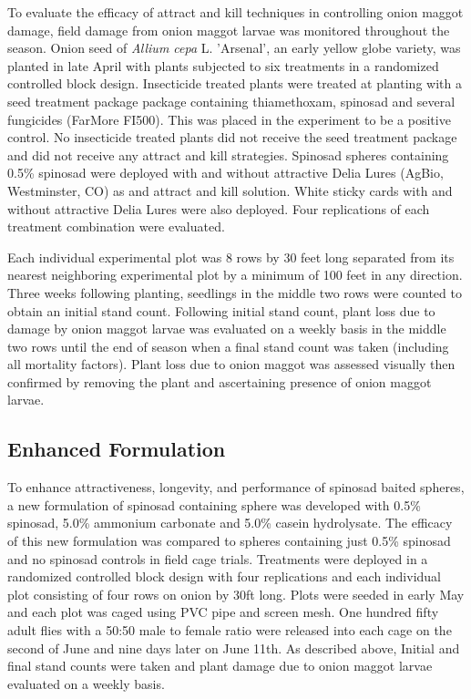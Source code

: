 \documentclass[alpha-refs]{wiley-article}
\begin{document}
To evaluate the efficacy of attract and kill techniques in controlling onion maggot damage, field damage from onion maggot larvae was monitored throughout the season.  Onion seed of \textit{Allium cepa} L. 'Arsenal', an early yellow globe variety, was planted in late April with plants subjected to six treatments in a randomized controlled block design.  Insecticide treated plants were treated at planting with a seed treatment package package containing thiamethoxam, spinosad and several fungicides (FarMore FI500).  This was placed in the experiment to be a positive control.  No insecticide treated plants did not receive the seed treatment package and did not receive any attract and kill strategies.  Spinosad spheres containing 0.5\% spinosad were deployed with and without attractive Delia Lures (AgBio, Westminster, CO) as and attract and kill solution.  White sticky cards with and without attractive Delia Lures were also deployed.   Four replications of each treatment combination were evaluated.  

Each individual experimental plot was 8 rows by 30 feet long separated from its nearest neighboring experimental plot by a minimum of 100 feet in any direction.  Three weeks following planting, seedlings in the middle two rows were counted to obtain an initial stand count.  Following initial stand count, plant loss due to damage by onion maggot larvae was evaluated on a weekly basis in the middle two rows until the end of season when a final stand count was taken (including all mortality factors).  Plant loss due to onion maggot was assessed visually then confirmed by removing the plant and ascertaining presence of onion maggot larvae.  

\subsection{Enhanced Formulation}

To enhance attractiveness, longevity, and performance of spinosad baited spheres, a new formulation of spinosad containing sphere was developed with 0.5\% spinosad, 5.0\% ammonium carbonate and 5.0\% casein hydrolysate.  The efficacy of this new formulation was compared to spheres containing just 0.5\% spinosad and no spinosad controls in field cage trials.  Treatments were deployed in a randomized controlled block design with four replications and each individual plot consisting of four rows on onion by 30ft long.  Plots were seeded in early May and each plot was caged using PVC pipe and screen mesh.  One hundred fifty adult flies with a 50:50 male to female ratio were released into each cage on the second of June and nine days later on June 11th.   As described above, Initial and final stand counts were taken and plant damage due to onion maggot larvae evaluated on a weekly basis.  
\end{document}

